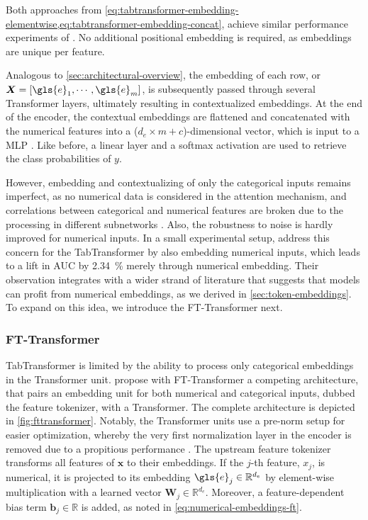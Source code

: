 Both approaches from \cref{eq:tabtransformer-embedding-elementwise,eq:tabtransformer-embedding-concat}, achieve similar performance experiments of \textcite[][11]{huangTabTransformerTabularData2020}. No additional positional embedding is required, as embeddings are unique per feature.

Analogous to \cref{sec:architectural-overview}, the embedding of each row, or $\boldsymbol{X} = [\gls{e}_1, \cdots, \gls{e}_m]$, is subsequently passed through several Transformer layers, ultimately resulting in contextualized embeddings. At the end of the encoder, the contextual embeddings are flattened and concatenated with the numerical features into a ($d_{e}\times m + c$)-dimensional vector, which is input to a \gls{MLP} \autocite[][3]{huangTabTransformerTabularData2020}. Like before, a linear layer and a softmax activation are used to retrieve the class probabilities of $y$.

However, embedding and contextualizing of only the categorical inputs remains imperfect, as no numerical data is considered in the attention mechanism, and correlations between categorical and numerical features are broken due to the processing in different subnetworks \autocite[][2]{somepalliSAINTImprovedNeural2021}. Also, the robustness to noise is hardly improved for numerical inputs. In a small experimental setup, \textcite[][8]{somepalliSAINTImprovedNeural2021} address this concern for the TabTransformer by also embedding numerical inputs, which leads to a lift in \gls{AUC} by \SI{2.34}{\percent} merely through numerical embedding. Their observation integrates with a wider strand of literature that suggests that models can profit from numerical embeddings, as we derived in \cref{sec:token-embeddings}. To expand on this idea, we introduce the FT-Transformer next.

\subsubsection{FT-Transformer}\label{sec:fttransformer}

TabTransformer is limited by the ability to process only categorical embeddings in the Transformer unit. \textcite[][5]{gorishniyRevisitingDeepLearning2021} propose with FT-Transformer a competing architecture, that pairs an embedding unit for both numerical and categorical inputs, dubbed the feature tokenizer, with a Transformer. The complete architecture is depicted in \cref{fig:fttransformer}. Notably, the Transformer units use a pre-norm setup for easier optimization, whereby the very first normalization layer in the encoder is removed due to a propitious performance \textcite[][17]{gorishniyRevisitingDeepLearning2021}. The upstream feature tokenizer transforms all features of $\boldsymbol{x}$ to their embeddings. If the $j$-th feature, $x_j$, is numerical, it is projected to its embedding $\gls{e}_j \in \mathbb{R}^{d_e}$ by element-wise multiplication with a learned vector $\boldsymbol{W}_j \in \mathbb{R}^{d_{e}}$. Moreover, a feature-dependent bias term $\boldsymbol{b}_j \in \mathbb{R}$ is added, as noted in \cref{eq:numerical-embeddings-ft}.

